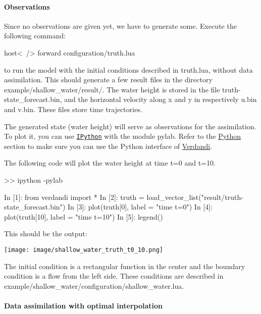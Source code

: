 \documentclass{tufte-book}
\begin{document}
\hypertarget{notation_observations}{}\paragraph{\-Observations}\label{notation_observations}

\-Since no observations are given yet, we have to generate some. \-Execute the following command\-:
\begin{frame_bash}
host<~/> forward configuration/truth.lua
\end{frame_bash}
  to run the model with the initial conditions described in {\ttfamily truth.\-lua}, without data assimilation. \-This should generate a few result files in the directory {\ttfamily example/shallow\-\_\-water/result/}. \-The water height is stored in the file {\ttfamily truth-\/state\-\_\-forecast.\-bin}, and the horizontal velocity along x and y in respectively {\ttfamily u.\-bin} and {\ttfamily v.\-bin}. \-These files store time trajectories.

\-The generated state (water height) will serve as observations for the assimilation. \-To plot it, you can use \href{http://ipython.scipy.org/}{\tt \-I\-Python} with the module pylab. \-Refer to the \hyperlink{python}{\-Python} section to make sure you can use the \-Python interface of \hyperlink{namespace_verdandi}{\-Verdandi}.

\-The following code will plot the water height at time t=0 and t=10.

\begin{frame_python}
>> ipython -pylab

In  [1]: from verdandi import *
In  [2]: truth = load_vector_list("result/truth-state_forecast.bin")
In  [3]: plot(truth[0], label = "time t=0")
In  [4]: plot(truth[10], label = "time t=10")
In  [5]: legend()

\end{frame_python}


\-This should be the output\-:

\texttt{[image: image/shallow\_water\_truth\_t0\_10.png]}

\-The initial condition is a rectangular function in the center and the boundary condition is a flow from the left side. \-These conditions are described in {\ttfamily example/shallow\-\_\-water/configuration/shallow\-\_\-water.\-lua}.

\hypertarget{example_programs_assimilation}{}\paragraph{\-Data assimilation with optimal interpolation}\label{example_programs_assimilation}
\end{document}

